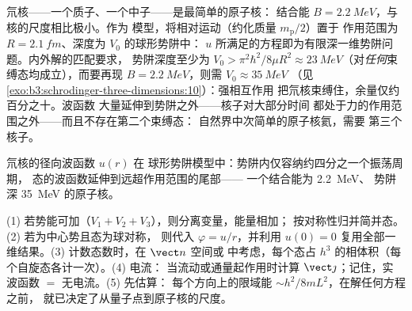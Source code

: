 \begin{example}[氘核：几乎算不上原子核]\label{ex:b3:schrodinger-three-dimensions:deuteron}
氘核——一个质子、一个中子——是最简单的原子核：
结合能 $B = \qty{2.2}{MeV}$，与核的尺度相比极小。作为
模型，将相对运动（约化质量 $m_{\text{p}}/2$）置于
作用范围为 $R = \qty{2.1}{fm}$、深度为 $V_0$ 的球形势阱中：
$u$ 所满足的方程即为有限深一维势阱问题。内外解的匹配要求，
势阱深度至少为 $V_0 > \pi^2\hbar^2/8\mu R^2
\approx \qty{23}{MeV}$（对\emph{任何}束缚态均成立），而要再现
$B = \qty{2.2}{MeV}$，则需 $V_0 \approx \qty{35}{MeV}$
（见\cref{exo:b3:schrodinger-three-dimensions:10}）：强相互作用
把氘核束缚住，余量仅约百分之十。波函数
大量延伸到势阱之外——核子对大部分时间
都处于力的作用范围之外——而且不存在第二个束缚态：
自然界中次简单的原子核氦，需要
第三个核子。
\end{example}

\begin{omfigure}

{\small 氘核的径向波函数 $u(r)$ 在
球形势阱模型中：势阱内仅容纳约四分之一个振荡周期，
态的波函数延伸到远超作用范围的尾部——
一个结合能为 \qty{2.2}{MeV}、
势阱深 \qty{35}{MeV} 的原子核。}
\end{omfigure}

\begin{method}[三维问题]\label{met:b3:schrodinger-three-dimensions:method}
(1) 若势能可加（$V_1 + V_2 + V_3$），则分离变量，能量相加；
按对称性归并简并态。(2) 若为中心势且态为球对称，
则代入 $\varphi = u/r$，并利用
$u(0) = 0$ 复用全部一维结果。(3) 计数态数时，在 $\vect n$ 空间或
中考虑，每个态占 $h^3$ 的相体积（每个自旋态各计一次）。(4) 电流：
当流动或通量起作用时计算 $\vect\jmath$；记住，实
波函数 $=$ 无电流。(5) 先估算：
每个方向上的限域能 $\sim h^2/8mL^2$，在解任何方程之前，
就已决定了从量子点到原子核的尺度。
\end{method}

